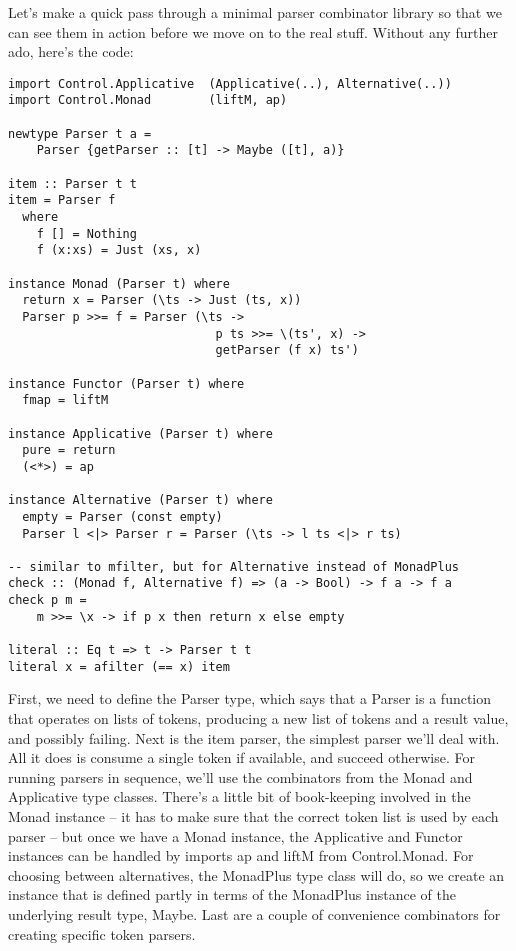 \documentclass{tmr}
\begin{document}
Let's make a quick pass through a minimal parser combinator library so that we
can see them in action before we move on to the real stuff.  Without any 
further ado, here's the code:
\begin{verbatim}
import Control.Applicative  (Applicative(..), Alternative(..))
import Control.Monad        (liftM, ap)

newtype Parser t a = 
    Parser {getParser :: [t] -> Maybe ([t], a)}

item :: Parser t t
item = Parser f
  where 
    f [] = Nothing
    f (x:xs) = Just (xs, x)

instance Monad (Parser t) where
  return x = Parser (\ts -> Just (ts, x))
  Parser p >>= f = Parser (\ts ->
                             p ts >>= \(ts', x) ->
                             getParser (f x) ts')

instance Functor (Parser t) where
  fmap = liftM
  
instance Applicative (Parser t) where
  pure = return
  (<*>) = ap          

instance Alternative (Parser t) where
  empty = Parser (const empty)
  Parser l <|> Parser r = Parser (\ts -> l ts <|> r ts)

-- similar to mfilter, but for Alternative instead of MonadPlus
check :: (Monad f, Alternative f) => (a -> Bool) -> f a -> f a
check p m =
    m >>= \x -> if p x then return x else empty

literal :: Eq t => t -> Parser t t
literal x = afilter (== x) item
\end{verbatim}
First, we need to define the Parser type, which says that a Parser is a function
that operates on lists of tokens, producing a new list of tokens and a result
value, and possibly failing.
Next is the item parser, the simplest parser we'll deal with.  All it does is 
consume a single token if available, and succeed otherwise.
For running parsers in sequence, we'll use the combinators from the Monad and
Applicative type classes.  There's a little bit of book-keeping involved in the
Monad instance -- it has to make sure that the correct token list is used by
each parser -- but once we have a Monad instance, the Applicative and Functor
instances can be handled by imports ap and liftM from Control.Monad.
For choosing between alternatives, the MonadPlus type class will do, so we create
an instance that is defined partly in terms of the MonadPlus instance of the
underlying result type, Maybe.
Last are a couple of convenience combinators for creating specific token parsers.
\end{document}
